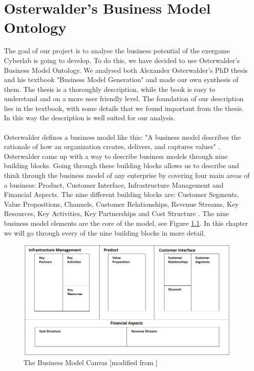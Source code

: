\chapter{Osterwalder's Business Model Ontology}
The goal of our project is to analyse the business potential of the exergame Cyberlab is going to develop. To do this, we have decided to use Osterwalder's Business Model Ontology. We analysed both Alexander Osterwalder's PhD thesis \cite{osterwalderthesis} and his textbook "Business Model Generation" \cite{osterwalder} and made our own synthesis of them. The thesis is a thoroughly description, while the book is easy to understand and on a more user friendly level. The foundation of our description lies in the textbook, with some details that we found important from the thesis. In this way the description is well suited for our analysis.\\ \\
Osterwalder defines a business model like this: "A business model describes the rationale of how an organization creates, delivers, and captures values" \cite{osterwalder}. Osterwalder came up with a way to describe business models through nine building blocks. Going through these building blocks allows us to describe and think through the business model of any enterprise by covering four main areas of a business:  Product, Customer Interface, Infrastructure Management and Financial Aspects. The nine different building blocks are: Customer Segments, Value Propositions, Channels, Customer Relationships, Revenue Streams, Key Resources, Key Activities, Key Partnerships and Cost Structure \cite{osterwalder}. The nine business model elements are the core of the model, see Figure \ref{fig:TheBusinessModelCanvas}. In this chapter we will go through every of the nine building blocks in more detail. 

\begin{figure}
\begin{center}
\includegraphics[angle=90, scale=0.6]{osterwaldersbmmodified}
\caption[The Business Model Canvas ]{The Business Model Canvas [modified from \cite{osterwalder}]}
\label{fig:TheBusinessModelCanvas}
\end{center}
\end{figure}

